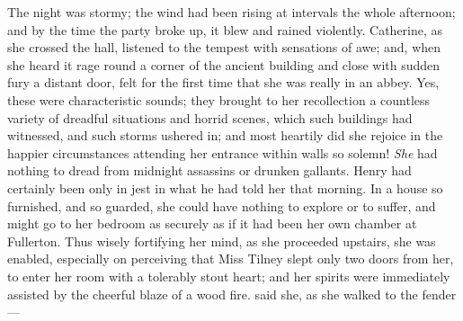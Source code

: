 The night was stormy; the wind had been rising at intervals the whole afternoon; and by the time the party broke up, it blew and rained violently. Catherine, as she crossed the hall, listened to the tempest with sensations of awe; and, when she heard it rage round a corner of the ancient building and close with sudden fury a distant door, felt for the first time that she was really in an abbey. Yes, these were characteristic sounds; they brought to her recollection a countless variety of dreadful situations and horrid scenes, which such buildings had witnessed, and such storms ushered in; and most heartily did she rejoice in the happier circumstances attending her entrance within walls so solemn! {\em She} had nothing to dread from midnight assassins or drunken gallants. Henry had certainly been only in jest in what he had told her that morning. In a house so furnished, and so guarded, she could have nothing to explore or to suffer, and might go to her bedroom as securely as if it had been her own chamber at Fullerton. Thus wisely fortifying her mind, as she proceeded upstairs, she was enabled, especially on perceiving that Miss Tilney slept only two doors from her, to enter her room with a tolerably stout heart; and her spirits were immediately assisted by the cheerful blaze of a wood fire.  said she, as she walked to the fender---

